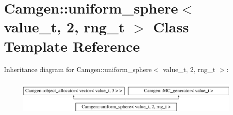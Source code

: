\hypertarget{a00568}{}\section{Camgen\+:\+:uniform\+\_\+sphere$<$ value\+\_\+t, 2, rng\+\_\+t $>$ Class Template Reference}
\label{a00568}
Inheritance diagram for Camgen\+:\+:uniform\+\_\+sphere$<$ value\+\_\+t, 2, rng\+\_\+t $>$\+:\begin{figure}[H]
\begin{center}
\leavevmode
\includegraphics[height=1.848185cm]{a00568}
\end{center}
\end{figure}
